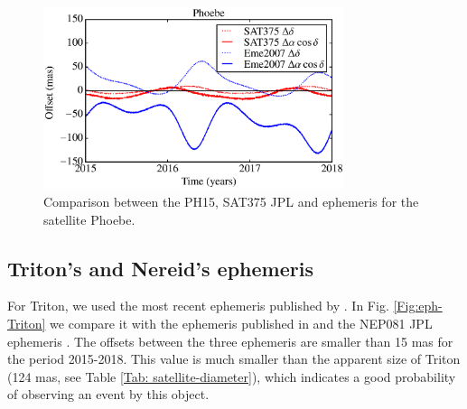\documentclass[useAMS,usenatbib]{mn2e}
\begin{document}
\begin{figure}
\begin{centering}
\includegraphics[width=8.8cm]{figures/Phoebe.eps} 
\caption{Comparison between the PH15, SAT375 JPL and \protect\cite{Emelyanov2007} ephemeris for the satellite Phoebe.}
\label{Fig:eph-Phoebe}
\end{centering}
\end{figure}

\subsection{Triton's and Nereid's ephemeris}

For Triton, we used the most recent ephemeris published by \cite{Emelyanov2015}. In Fig. \ref{Fig:eph-Triton} we compare it with the ephemeris published in \cite{Zhang2014} and the NEP081 JPL ephemeris \citep{Jacobson2009}. The offsets between the three ephemeris are smaller than 15 mas for the period 2015-2018. This value is much smaller than the apparent size of Triton (124 mas, see Table \ref{Tab: satellite-diameter}), which indicates a good probability of observing an event by this object.
\end{document}
